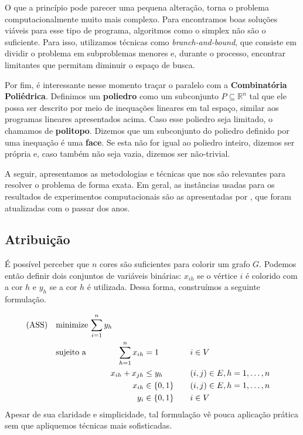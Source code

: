 \documentclass[11pt]{article}
\begin{document}
O que a princípio pode parecer uma pequena alteração, torna o problema computacionalmente muito mais complexo.
Para encontramos boas soluções viáveis para esse tipo de programa, algoritmos como o simplex não são o suficiente.
Para isso, utilizamos técnicas como \emph{branch-and-bound}, que consiste em dividir o problema em subproblemas menores e, durante o processo, encontrar limitantes que permitam diminuir o espaço de busca.

Por fim, é interessante nesse momento traçar o paralelo com a \textbf{Combinatória Poliédrica}.
Definimos um \textbf{poliedro} como um subconjunto \(P \subseteq \mathbb{R}^n\) tal que ele possa ser descrito por meio de inequações lineares em tal espaço, similar aos programas lineares apresentados acima.
Caso esse poliedro seja limitado, o chamamos de \textbf{politopo}.
Dizemos que um subconjunto do poliedro definido por uma inequação é uma \textbf{face}.
Se esta não for igual ao poliedro inteiro, dizemos ser própria e, caso também não seja vazia, dizemos ser não-trivial.

A seguir, apresentamos as metodologias e técnicas que nos são relevantes para resolver o problema de forma exata.
Em geral, as instâncias usadas para os resultados de experimentos computacionais são as apresentadas por \textcite{DIMACSGraphColoringInstances}, que foram atualizadas com o passar dos anos.

\subsection{Atribuição}
\label{sec:org397d6d7}
É possível perceber que \(n\) cores são suficientes para colorir um grafo \(G\). Podemos então definir dois conjuntos de variáveis binárias: \(x_{ih}\) se o vértice \(i\) é colorido com a cor \(h\) e \(y_h\) se a cor \(h\) é utilizada. Dessa forma, construímos a seguinte formulação.

\begin{alignat*}{4}
\label{ass}
\mathrm{(ASS)} \quad & \omit\rlap{minimize  $\displaystyle \sum_{i=1}^n y_h$} \\
& \mbox{sujeito a}&& \quad & \sum_{h=1}^n x_{ih}&= 1        & \quad & i \in V \\
&                 &&   & x_{ih} + x_{jh}    & \leq y_h &   & (i,j) \in E, h=1,\dots,n \\
&                 &&   & x_{ih}    & \in \{0,1\} &   & (i,j) \in E, h=1,\dots,n\\
&                 &&   & y_i       & \in \{0,1\} &   & i \in V
\end{alignat*}
Apesar de sua claridade e simplicidade, tal formulação vê pouca aplicação prática sem que apliquemos técnicas mais sofisticadas.
\end{document}
